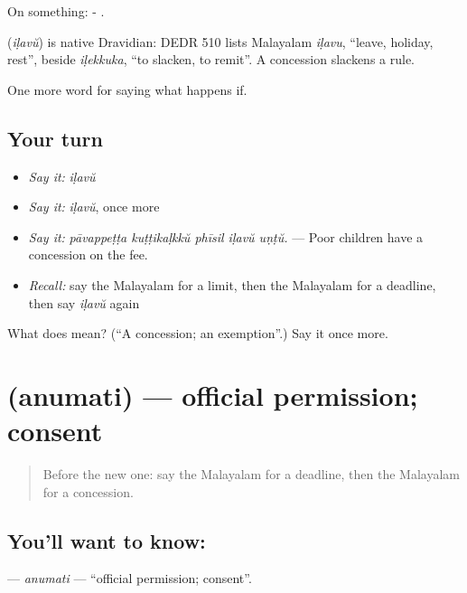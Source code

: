 On something: - .

\begin{cousinweb}
\textbf{} (\emph{iḷavŭ}) is native Dravidian: DEDR 510 lists Malayalam \emph{iḷavu}, \textquotedblleft{}leave, holiday, rest\textquotedblright{}, beside \emph{iḷekkuka}, \textquotedblleft{}to slacken, to remit\textquotedblright{}. A concession slackens a rule.
\end{cousinweb}

\begin{grammarlens}[title={What you've built}]
One more word for saying what happens if.
\end{grammarlens}

\subsection*{Your turn}
\begin{itemize}
\raggedright
  \item \emph{Say it:} \emph{iḷavŭ}
  \item \emph{Say it:} \emph{iḷavŭ}, once more
  \item \emph{Say it:} \emph{pāvappeṭṭa kuṭṭikaḷkkŭ phīsil iḷavŭ uṇṭŭ.} — Poor children have a concession on the fee.
  \item \emph{Recall:} say the Malayalam for a limit, then the Malayalam for a deadline, then say \emph{iḷavŭ} again
\end{itemize}

\begin{tcolorbox}[breakable,colback=teal!4,colframe=teal!35!black,title={Before you move on}]
What does  mean? (\textquotedblleft{}A concession; an exemption\textquotedblright{}.) Say it once more.
\end{tcolorbox}
\section[\texorpdfstring{\ml{അനുമതി} (anumati)}{അനുമതി (anumati)}]{ (anumati) — official permission; consent}

\label{lesson:ML-C444-anumati}



\begin{quote}
Before the new one: say the Malayalam for a deadline, then the Malayalam for a concession.
\end{quote}

\subsection*{You'll want to know: }
\textbf{} — \emph{anumati} — \textquotedblleft{}official permission; consent\textquotedblright{}.

